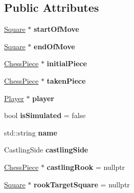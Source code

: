 \subsection*{Public Attributes}
\begin{DoxyCompactItemize}
\item 
\mbox{\label{class_move_adcbbe513c87c0dcc19f05619973a3b1d}} 
\mbox{\hyperlink{class_square}{Square}} $\ast$ {\bfseries start\+Of\+Move}
\item 
\mbox{\label{class_move_a4e8eb6c451062b79d880ce3d346e20af}} 
\mbox{\hyperlink{class_square}{Square}} $\ast$ {\bfseries end\+Of\+Move}
\item 
\mbox{\label{class_move_a2f179bb489b6f1a14830e1e81b5eccfd}} 
\mbox{\hyperlink{class_chess_piece}{Chess\+Piece}} $\ast$ {\bfseries initial\+Piece}
\item 
\mbox{\label{class_move_adcc5fa48f045b094b32cd8f902d57acd}} 
\mbox{\hyperlink{class_chess_piece}{Chess\+Piece}} $\ast$ {\bfseries taken\+Piece}
\item 
\mbox{\label{class_move_a1fbc388e091cd5639b755ebca2a8f90b}} 
\mbox{\hyperlink{class_player}{Player}} $\ast$ {\bfseries player}
\item 
\mbox{\label{class_move_a8861c7af9b982677666292f88c06029d}} 
bool {\bfseries is\+Simulated} = false
\item 
\mbox{\label{class_move_aeb167ac5b5026207799035ea00467a20}} 
std\+::string {\bfseries name}
\item 
\mbox{\label{class_move_a264e68c2f070d39c895889b2edfc66b0}} 
Castling\+Side {\bfseries castling\+Side}
\item 
\mbox{\label{class_move_a6a0dc44a92343f6f0f951df9d2c5add3}} 
\mbox{\hyperlink{class_chess_piece}{Chess\+Piece}} $\ast$ {\bfseries castling\+Rook} = nullptr
\item 
\mbox{\label{class_move_aa904a23353053bc9a8c963828a89e032}} 
\mbox{\hyperlink{class_square}{Square}} $\ast$ {\bfseries rook\+Target\+Square} = nullptr
\item 

\end{DoxyCompactItemize}
